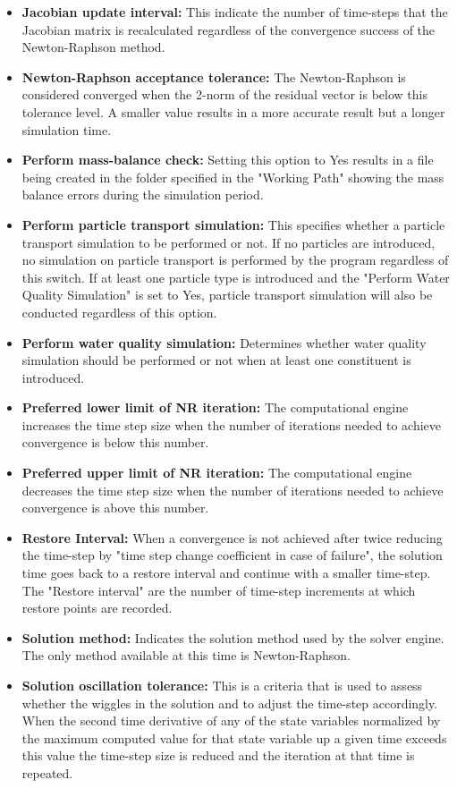 \begin{itemize}
\item \textbf{Jacobian update interval: }  This indicate the number of time-steps that the Jacobian matrix is recalculated regardless of the convergence success of the Newton-Raphson method. 
\item \textbf{Newton-Raphson acceptance tolerance: }  The Newton-Raphson is considered converged when the 2-norm of the residual vector is below this tolerance level. A smaller value results in a more accurate result but a longer simulation time. 
\item \textbf{Perform mass-balance check: }  Setting this option to Yes results in a file being created in the folder specified in the "Working Path" showing the mass balance errors during the simulation period. 
\item \textbf{Perform particle transport simulation: } This specifies whether a particle transport simulation to be performed or not. If no particles are introduced, no simulation on particle transport is performed by the program regardless of this switch. If at least one particle type is introduced and the "Perform Water Quality Simulation" is set to Yes, particle transport simulation will also be conducted regardless of this option. 
\item \textbf{Perform water quality simulation:} Determines whether water quality simulation should be performed or not when at least one constituent is introduced.
\item \textbf{Preferred lower limit of NR iteration:} The computational engine increases the time step size when the number of iterations needed to achieve convergence is below this number. 
\item \textbf{Preferred upper limit of NR iteration:} The computational engine decreases the time step size when the number of iterations needed to achieve convergence is above this number. 
\item \textbf{Restore Interval:} When a convergence is not achieved after twice reducing the time-step by "time step change coefficient in case of failure", the solution time goes back to a restore interval and continue with a smaller time-step. The "Restore interval" are the number of time-step increments at which restore points are recorded.
\item \textbf{Solution method:} Indicates the solution method used by the solver engine. The only method available at this time is Newton-Raphson. 
\item \textbf{Solution oscillation tolerance: } This is a criteria that is used to assess whether the wiggles in the solution and to adjust the time-step accordingly. When the second time derivative of any of the state variables normalized by the maximum computed value for that state variable up a given time exceeds this value the time-step size is reduced and the iteration at that time is repeated.

\end{itemize}
